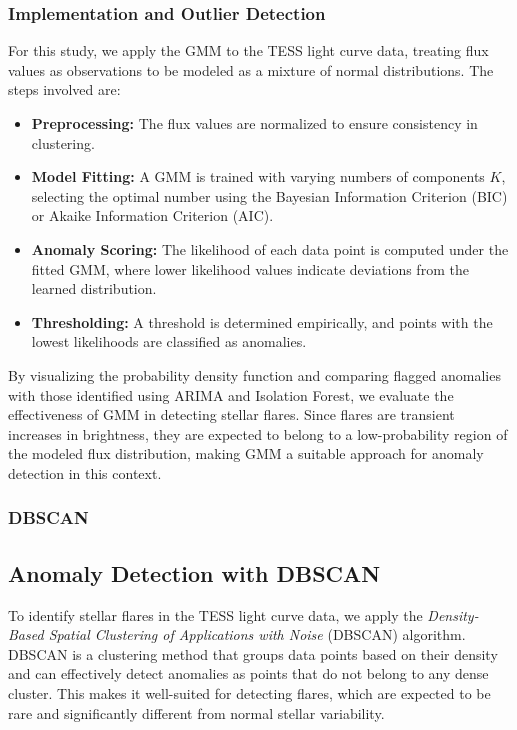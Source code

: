 \documentclass[
]{article}
\begin{document}
\subsubsection{Implementation and Outlier Detection}

For this study, we apply the GMM to the TESS light curve data, treating flux values as observations to be modeled as a mixture of normal distributions. The steps involved are:

\begin{itemize}
    \item \textbf{Preprocessing:} The flux values are normalized to ensure consistency in clustering.
    \item \textbf{Model Fitting:} A GMM is trained with varying numbers of components $K$, selecting the optimal number using the Bayesian Information Criterion (BIC) or Akaike Information Criterion (AIC).
    \item \textbf{Anomaly Scoring:} The likelihood of each data point is computed under the fitted GMM, where lower likelihood values indicate deviations from the learned distribution.
    \item \textbf{Thresholding:} A threshold is determined empirically, and points with the lowest likelihoods are classified as anomalies.
\end{itemize}

By visualizing the probability density function and comparing flagged anomalies with those identified using ARIMA and Isolation Forest, we evaluate the effectiveness of GMM in detecting stellar flares. Since flares are transient increases in brightness, they are expected to belong to a low-probability region of the modeled flux distribution, making GMM a suitable approach for anomaly detection in this context.

\subsubsection{DBSCAN}\label{dbscan}

\subsection{Anomaly Detection with DBSCAN}

To identify stellar flares in the TESS light curve data, we apply the \textit{Density-Based Spatial Clustering of Applications with Noise} (DBSCAN) algorithm. DBSCAN is a clustering method that groups data points based on their density and can effectively detect anomalies as points that do not belong to any dense cluster. This makes it well-suited for detecting flares, which are expected to be rare and significantly different from normal stellar variability.
\end{document}
